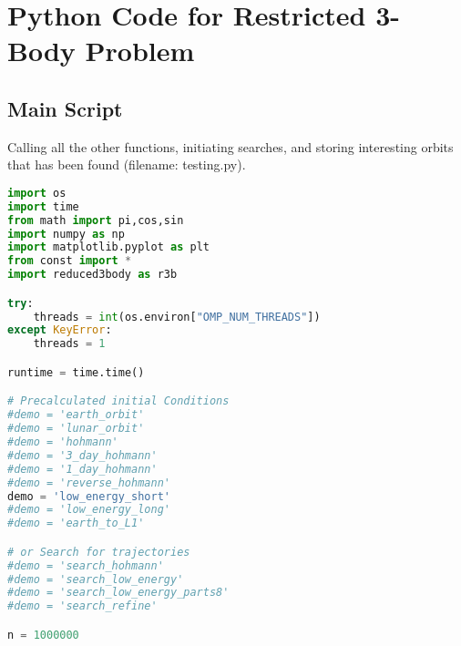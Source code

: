\chapter{Python Code for Restricted 3-Body Problem} \label{app:code-r3b}

\section{Main Script} \label{app:code-testing}
Calling all the other functions, initiating searches, and storing interesting orbits that has been found (filename: testing.py).
\begin{adjustwidth*}{0cm}{-0.4cm}
\begin{lstlisting}[language=Python]
import os
import time
from math import pi,cos,sin
import numpy as np
import matplotlib.pyplot as plt
from const import *
import reduced3body as r3b

try:  
    threads = int(os.environ["OMP_NUM_THREADS"])
except KeyError: 
    threads = 1

runtime = time.time()

# Precalculated initial Conditions
#demo = 'earth_orbit'
#demo = 'lunar_orbit'
#demo = 'hohmann'
#demo = '3_day_hohmann'
#demo = '1_day_hohmann'
#demo = 'reverse_hohmann'
demo = 'low_energy_short'
#demo = 'low_energy_long'
#demo = 'earth_to_L1'

# or Search for trajectories
#demo = 'search_hohmann'
#demo = 'search_low_energy'
#demo = 'search_low_energy_parts8'
#demo = 'search_refine'

n = 1000000


\end{lstlisting}
\end{adjustwidth*}
